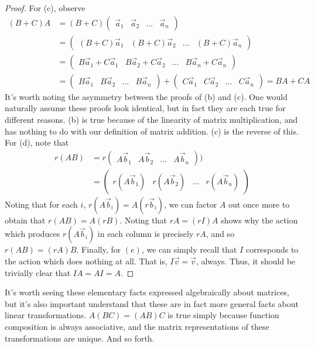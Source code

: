 \documentclass{article}
\theoremstyle{definition}
\theoremstyle{plain}
\theoremstyle{theorem}
\begin{document}
\begin{proof}
	For (c), observe
	\begin{align*}
		(B+C)A &= (B+C)\begin{pmatrix} \vec{a}_1 & \vec{a}_2 & \ldots & \vec{a}_n \end{pmatrix} \\
		&= \begin{pmatrix} (B+C)\vec{a}_1 & (B+C)\vec{a}_2 & \ldots & (B+C)\vec{a}_n \end{pmatrix} \\
		&= \begin{pmatrix} B\vec{a}_1+ C\vec{a}_1 & B\vec{a}_2+C\vec{a}_2 & \ldots & B\vec{a}_n+C\vec{a}_n \end{pmatrix} \\
		&= \begin{pmatrix} B\vec{a}_1 & B\vec{a}_2 & \ldots & B\vec{a}_n \end{pmatrix} + \begin{pmatrix} C\vec{a}_1 & C\vec{a}_2 & \ldots & C\vec{a}_n \end{pmatrix} = BA+CA
	\end{align*}
	It's worth noting the asymmetry between the proofs of (b) and (c). One would naturally assume these proofs look identical, but in fact they are each true for different reasons. (b) is true because of the linearity of matrix multiplication, and has nothing to do with our definition of matrix addition. (c) is the reverse of this. 
	For (d), note that
	\begin{align*}
		r(AB) &= r\begin{pmatrix} A\vec{b}_1 & A\vec{b}_2 & \ldots & A\vec{b}_n \end{pmatrix}) \\
		&= \begin{pmatrix} r(A\vec{b}_1) & r(A\vec{b}_2) & \ldots & r(A\vec{b}_n) \end{pmatrix}
	\end{align*}
	Noting that for each $i$, $r(A\vec{b}_i) = A(r\vec{b}_i)$, we can factor $A$ out once more to obtain that $r(AB) = A(rB)$. Noting that $rA = (rI)A$ shows why the action which produces $r(A\vec{b}_i)$ in each column is precisely $rA$, and so $r(AB) = (rA)B$. Finally, for $(e)$, we can simply recall that $I$ corresponds to the action which does nothing at all. That is, $I\vec{v} = \vec{v}$, always. Thus, it should be trivially clear that $IA = AI = A$. 
\end{proof}
It's worth seeing these elementary facts expressed algebraically about matrices, but it's also important understand that these are in fact more general facts about linear transformations. $A(BC) = (AB)C$ is true simply because function composition is always associative, and the matrix representations of these transformations are unique. And so forth. \par
\end{document}
